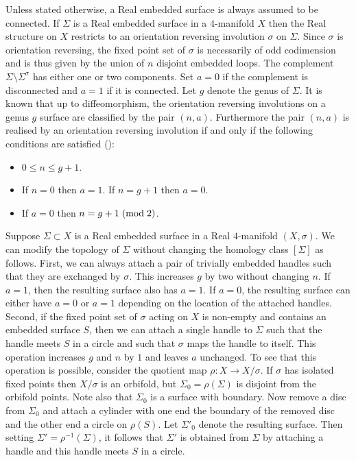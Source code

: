 \documentclass{amsart}
\theoremstyle{definition}
\theoremstyle{remark}
\numberwithin{equation}{section}
\begin{document}
Unless stated otherwise, a Real embedded surface is always assumed to be connected. If $\Sigma$ is a Real embedded surface in a $4$-manifold $X$ then the Real structure on $X$ restricts to an orientation reversing involution $\sigma$ on $\Sigma$. Since $\sigma$ is orientation reversing, the fixed point set of $\sigma$ is necessarily of odd codimension and is thus given by the union of $n$ disjoint embedded loops. The complement $\Sigma \setminus \Sigma^\sigma$ has either one or two components. Set $a=0$ if the complement is disconnected and $a=1$ if it is connected. Let $g$ denote the genus of $\Sigma$. It is known that up to diffeomorphism, the orientation reversing involutions on a genus $g$ surface are classified by the pair $(n,a)$. Furthermore the pair $(n,a)$ is realised by an orientation reversing involution if and only if the following conditions are satisfied (\cite[]{gh}):
\begin{itemize}
\item[(1)]{$0 \le n \le g+1$.}
\item[(2)]{If $n=0$ then $a=1$. If $n = g+1$ then $a=0$.}
\item[(3)]{If $a=0$ then $n = g+1 \; ({\rm mod} \; 2)$.}
\end{itemize}

Suppose $\Sigma \subset X$ is a Real embedded surface in a Real $4$-manifold $(X , \sigma)$. We can modify the topology of $\Sigma$ without changing the homology class $[\Sigma]$ as follows. First, we can always attach a pair of trivially embedded handles such that they are exchanged by $\sigma$. This increases $g$ by two without changing $n$. If $a=1$, then the resulting surface also has $a=1$. If $a=0$, the resulting surface can either have $a=0$ or $a=1$ depending on the location of the attached handles. Second, if the fixed point set of $\sigma$ acting on $X$ is non-empty and contains an embedded surface $S$, then we can attach a single handle to $\Sigma$ such that the handle meets $S$ in a circle and such that $\sigma$ maps the handle to itself. This operation increases $g$ and $n$ by $1$ and leaves $a$ unchanged. To see that this operation is possible, consider the quotient map $\rho : X \to X/\sigma$. If $\sigma$ has isolated fixed points then $X/\sigma$ is an orbifold, but $\Sigma_0 = \rho(\Sigma)$ is disjoint from the orbifold points. Note also that $\Sigma_0$ is a surface with boundary. Now remove a disc from $\Sigma_0$ and attach a cylinder with one end the boundary of the removed disc and the other end a circle on $\rho(S)$. Let $\Sigma'_0$ denote the resulting surface. Then setting $\Sigma' = \rho^{-1}(\Sigma)$, it follows that $\Sigma'$ is obtained from $\Sigma$ by attaching a handle and this handle meets $S$ in a circle.
\end{document}
